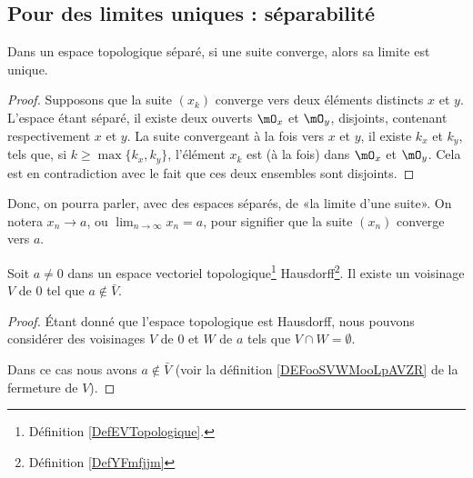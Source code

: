 \subsection{Pour des limites uniques : séparabilité}


\begin{proposition}\label{PropUniciteLimitePourSuites}
	Dans un espace topologique séparé, si une suite converge, alors sa limite est unique.
\end{proposition}
\begin{proof}
	Supposons que la suite \( (x_k)\) converge vers deux éléments distincts \( x \) et \( y \). L'espace étant séparé, il existe deux ouverts \( \mO_x \) et \( \mO_y \), disjoints, contenant respectivement \( x \) et \( y \). La suite convergeant à la fois vers \( x \) et \( y \), il existe \( k_x \) et \( k_y \), tels que, si \( k \geq \max\{k_x, k_y\} \), l'élément  \( x_k \) est (à la fois) dans  \( \mO_x \) et \( \mO_y \). Cela est en contradiction avec le fait que ces deux ensembles sont disjoints.
\end{proof}

\begin{normaltext}
	Donc, on pourra parler, avec des espaces séparés, de «la limite d'une suite». On notera \( x_n\to a\), ou \(\lim_{n\to \infty} x_n = a \), pour signifier que la suite \( (x_n) \) converge vers \( a \).
\end{normaltext}

\begin{lemma}        \label{LEMooMDTNooThlHJl}
	Soit \( a\neq 0\) dans un espace vectoriel topologique\footnote{Définition \ref{DefEVTopologique}.} Hausdorff\footnote{Définition \ref{DefYFmfjjm}}. Il existe un voisinage \( V\) de \( 0\) tel que \( a\notin \bar V\).
\end{lemma}

\begin{proof}
	Étant donné que l'espace topologique est Hausdorff, nous pouvons considérer des voisinages \( V\) de \( 0\) et \( W\) de \( a\) tels que \( V\cap W=\emptyset\).

	Dans ce cas nous avons \( a\notin \bar V\) (voir la définition \ref{DEFooSVWMooLpAVZR} de la fermeture de \( V\)).
\end{proof}

